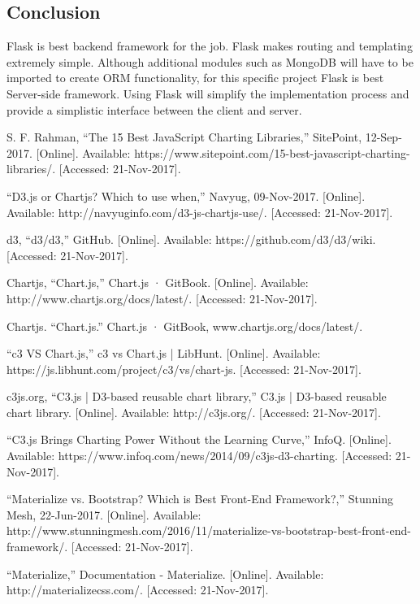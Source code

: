 \documentclass[onecolumn, draftclsnofoot,10pt, compsoc]{IEEEtran}
\begin{document}
\subsection{Conclusion}
Flask is best backend framework for the job. Flask makes routing and templating extremely simple. Although additional modules such as MongoDB will have to be imported to create ORM functionality, for this specific project Flask is best Server-side framework. Using Flask will simplify the implementation process and provide a simplistic interface between the client and server.


\begin{thebibliography}{9}
S. F. Rahman, “The 15 Best JavaScript Charting Libraries,” SitePoint, 12-Sep-2017. [Online]. Available: https://www.sitepoint.com/15-best-javascript-charting-libraries/. [Accessed: 21-Nov-2017].

“D3.js or Chartjs? Which to use when,” Navyug, 09-Nov-2017. [Online]. Available: http://navyuginfo.com/d3-js-chartjs-use/. [Accessed: 21-Nov-2017].

d3, “d3/d3,” GitHub. [Online]. Available: https://github.com/d3/d3/wiki. [Accessed: 21-Nov-2017].

Chartjs, “Chart.js,” Chart.js · GitBook. [Online]. Available: http://www.chartjs.org/docs/latest/. [Accessed: 21-Nov-2017].

Chartjs. “Chart.js.” Chart.js · GitBook, www.chartjs.org/docs/latest/.

“c3 VS Chart.js,” c3 vs Chart.js | LibHunt. [Online]. Available: https://js.libhunt.com/project/c3/vs/chart-js. [Accessed: 21-Nov-2017].

c3js.org, “C3.js | D3-based reusable chart library,” C3.js | D3-based reusable chart library. [Online]. Available: http://c3js.org/. [Accessed: 21-Nov-2017].

“C3.js Brings Charting Power Without the Learning Curve,” InfoQ. [Online]. Available: https://www.infoq.com/news/2014/09/c3js-d3-charting. [Accessed: 21-Nov-2017].

“Materialize vs. Bootstrap? Which is Best Front-End Framework?,” Stunning Mesh, 22-Jun-2017. [Online]. Available: http://www.stunningmesh.com/2016/11/materialize-vs-bootstrap-best-front-end-framework/. [Accessed: 21-Nov-2017].

“Materialize,” Documentation - Materialize. [Online]. Available: http://materializecss.com/. [Accessed: 21-Nov-2017].


\end{thebibliography}
\end{document}
